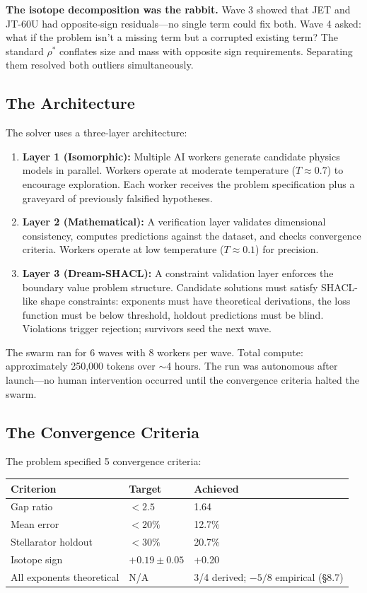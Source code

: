 \documentclass[11pt,letterpaper]{article}
\newcommand{\rhostar}{\rho^*}
\begin{document}
\textbf{The isotope decomposition was the rabbit.} Wave 3 showed that JET and JT-60U had opposite-sign residuals---no single term could fix both. Wave 4 asked: what if the problem isn't a missing term but a corrupted existing term? The standard $\rhostar$ conflates size and mass with opposite sign requirements. Separating them resolved both outliers simultaneously.

\subsection{The Architecture}

The solver uses a three-layer architecture:

\begin{enumerate}
\item \textbf{Layer 1 (Isomorphic):} Multiple AI workers generate candidate physics models in parallel. Workers operate at moderate temperature ($T \approx 0.7$) to encourage exploration. Each worker receives the problem specification plus a graveyard of previously falsified hypotheses.

\item \textbf{Layer 2 (Mathematical):} A verification layer validates dimensional consistency, computes predictions against the dataset, and checks convergence criteria. Workers operate at low temperature ($T \approx 0.1$) for precision.

\item \textbf{Layer 3 (Dream-SHACL):} A constraint validation layer enforces the boundary value problem structure. Candidate solutions must satisfy SHACL-like shape constraints: exponents must have theoretical derivations, the loss function must be below threshold, holdout predictions must be blind. Violations trigger rejection; survivors seed the next wave.
\end{enumerate}

The swarm ran for 6 waves with 8 workers per wave. Total compute: approximately 250,000 tokens over $\sim$4 hours. The run was autonomous after launch---no human intervention occurred until the convergence criteria halted the swarm.

\subsection{The Convergence Criteria}

The problem specified 5 convergence criteria:

\begin{center}
\begin{tabular}{lll}
\toprule
\textbf{Criterion} & \textbf{Target} & \textbf{Achieved} \\
\midrule
Gap ratio & $< 2.5$ & 1.64 \\
Mean error & $< 20\%$ & 12.7\% \\
Stellarator holdout & $< 30\%$ & 20.7\% \\
Isotope sign & $+0.19 \pm 0.05$ & +0.20 \\
All exponents theoretical & N/A & 3/4 derived; $-5/8$ empirical (\S8.7) \\
\bottomrule
\end{tabular}
\end{center}
\end{document}
